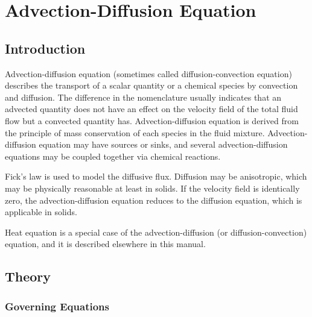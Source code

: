 \chapter{Advection-Diffusion Equation}
\noindent
{}
\begin{versiona}

\section{Introduction}

Advection-diffusion equation (sometimes called diffusion-convection equation)
describes the transport of a scalar quantity or a chemical species by
convection and diffusion. The difference in the nomenclature usually indicates
that an advected quantity does not have an effect on the velocity field of
the total fluid flow but a convected quantity has. Advection-diffusion equation
is derived from the principle of mass conservation of each species in the fluid
mixture. Advection-diffusion equation may have sources or sinks, and several
advection-diffusion equations may be coupled together via chemical reactions.

Fick's law is used to model the diffusive flux. Diffusion may be anisotropic,
which may be physically reasonable at least in solids. If the velocity field
is identically zero, the advection-diffusion equation reduces to the diffusion
equation, which is applicable in solids.

Heat equation is a special case of the advection-diffusion
(or diffusion-convection) equation, and it is described elsewhere in this
manual.

\section{Theory}

\subsection{Governing Equations}


\end{versiona}
